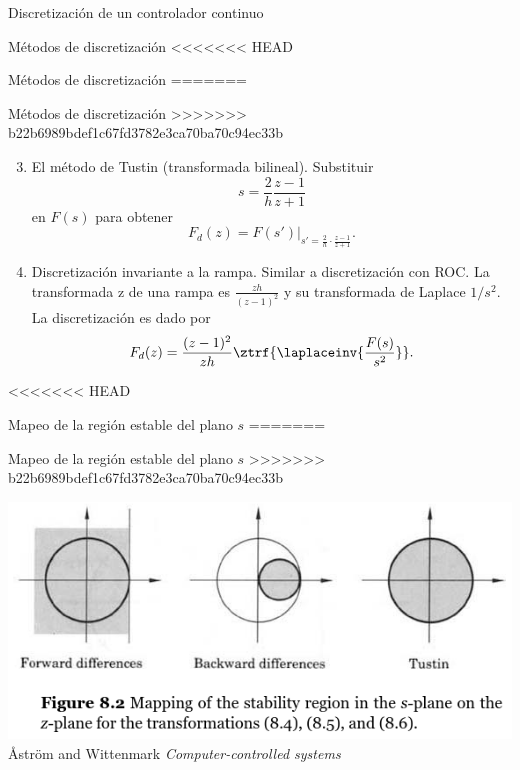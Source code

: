 \documentclass[presentation,aspectratio=1610]{beamer}
\begin{document}
\begin{frame}[label={sec:org86d23da}]{Discretización de un controlador continuo}
\begin{frame}[label={sec:org3ca2082}]{Métodos de discretización}
<<<<<<< HEAD
\begin{frame}[label={sec:orga78cff2}]{Métodos de discretización}
=======
\begin{frame}[label={sec:orgfcd5de8}]{Métodos de discretización}
>>>>>>> b22b6989bdef1c67fd3782e3ca70ba70c94ec33b
\begin{enumerate}
\setcounter{enumi}{2}
\item El método de Tustin (transformada bilineal). Substituir
\[ s = \frac{2}{h}\frac{z-1}{z+1} \] en \(F(s)\) para obtener
\[ F_d(z) = F(s')|_{s'=\frac{2}{h}\cdot \frac{z-1}{z+1}}. \]
\item Discretización invariante a la rampa. Similar a discretización con ROC. La transformada z de una rampa es  \(\frac{zh}{(z-1)^2}\) y su transformada de Laplace \(1/s^2\). La discretización es dado por
\[ F_d(z) = \frac{(z-1)^2}{zh} \ztrf{\laplaceinv{\frac{F(s)}{s^2}}}. \]
\end{enumerate}
\end{frame}

<<<<<<< HEAD
\begin{frame}[label={sec:org28bff53}]{Mapeo de la región estable del plano \(s\)}
=======
\begin{frame}[label={sec:orge51887e}]{Mapeo de la región estable del plano \(s\)}
>>>>>>> b22b6989bdef1c67fd3782e3ca70ba70c94ec33b
\begin{center}
 \includegraphics[width=0.79\linewidth]{../../figures/fig8-2.png}\\
{\tiny Åström and Wittenmark \emph{Computer-controlled systems}}
\end{center}
\end{frame}


\end{frame}
\end{frame}
\end{frame}
\end{frame}
\end{document}
